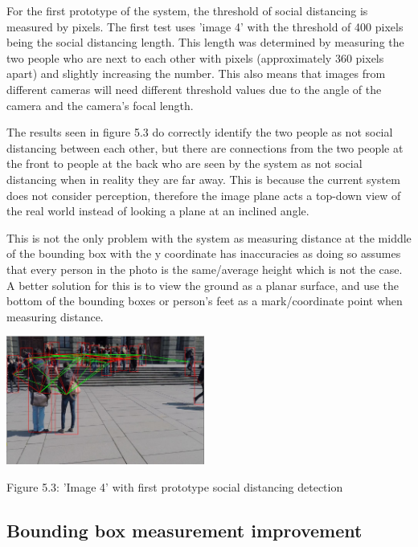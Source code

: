 \documentclass[12pt]{report}
\begin{document}
\vspace{2mm}

For the first prototype of the system, the threshold of social distancing is measured by pixels. The first test uses 'image 4' with the threshold of 400 pixels being the social distancing length. This length was determined by measuring the two people who are next to each other with pixels (approximately 360 pixels apart) and slightly increasing the number. This also means that images from different cameras will need different threshold values due to the angle of the camera and the camera's focal length.

\vspace{2mm}

The results seen in figure 5.3 do correctly identify the two people as not social distancing between each other, but there are connections from the two people at the front to people at the back who are seen by the system as not social distancing when in reality they are far away. This is because the current system does not consider perception, therefore the image plane acts a top-down view of the real world instead of looking a plane at an inclined angle.

\vspace{2mm}

This is not the only problem with the system as measuring distance at the middle of the bounding box with the y coordinate has inaccuracies as doing so assumes that every person in the photo is the same/average height which is not the case. A better solution for this is to view the ground as a planar surface, and use the bottom of the bounding boxes or person's feet as a mark/coordinate point when measuring distance. 

\begin{center}
	\includegraphics[width=65mm]{./images/appendix/test1.JPG}
	
	{\footnotesize Figure 5.3: 'Image 4' with first prototype social distancing detection}
\end{center}

\subsection*{Bounding box measurement improvement}
\end{document}
